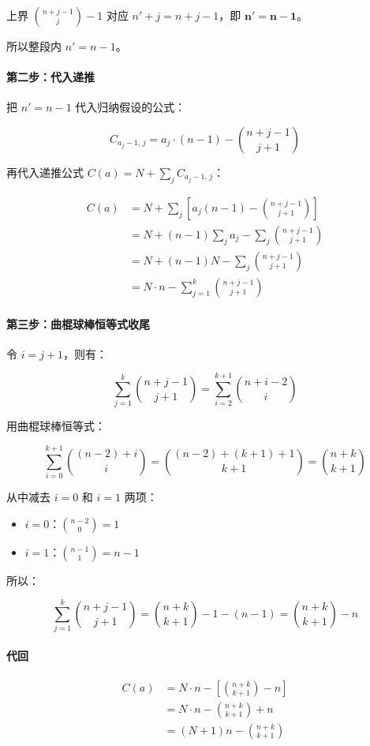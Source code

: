 \documentclass[12pt,a4paper]{article}
\begin{document}
上界 $\binom{n+j-1}{j}-1$ 对应 $n'+j = n+j-1$，即 $\mathbf{n' = n-1}$。

所以整段内 $n' = n-1$。

\paragraph{第二步：代入递推}

把 $n' = n-1$ 代入归纳假设的公式：

$$
C_{a_j-1,\,j} = a_j \cdot (n-1) - \binom{n+j-1}{j+1}
$$

再代入递推公式 $C(a) = N + \sum_j C_{a_j-1,\,j}$：

$$
\begin{aligned}
C(a) &= N + \sum_j \left[ a_j(n-1) - \binom{n+j-1}{j+1} \right] \\
     &= N + (n-1)\sum_j a_j - \sum_j \binom{n+j-1}{j+1} \\
     &= N + (n-1)N - \sum_j \binom{n+j-1}{j+1} \\
     &= N \cdot n - \sum_{j=1}^{k} \binom{n+j-1}{j+1}
\end{aligned}
$$

\paragraph{第三步：曲棍球棒恒等式收尾}

令 $i = j+1$，则有：

$$
\sum_{j=1}^{k} \binom{n+j-1}{j+1}
= \sum_{i=2}^{k+1} \binom{n+i-2}{i}
$$

用曲棍球棒恒等式：

$$
\sum_{i=0}^{k+1} \binom{(n-2)+i}{i} = \binom{(n-2)+(k+1)+1}{k+1} = \binom{n+k}{k+1}
$$

从中减去 $i=0$ 和 $i=1$ 两项：

\begin{itemize}[nosep]
  \item $i=0$：$\binom{n-2}{0} = 1$
  \item $i=1$：$\binom{n-1}{1} = n-1$
\end{itemize}

所以：

$$
\sum_{j=1}^{k} \binom{n+j-1}{j+1}
= \binom{n+k}{k+1} - 1 - (n-1)
= \binom{n+k}{k+1} - n
$$

\paragraph{代回}

$$
\begin{aligned}
C(a) &= N \cdot n - \left[ \binom{n+k}{k+1} - n \right] \\
     &= N \cdot n - \binom{n+k}{k+1} + n \\
     &= (N+1)n - \binom{n+k}{k+1}
\end{aligned}
$$
\end{document}
